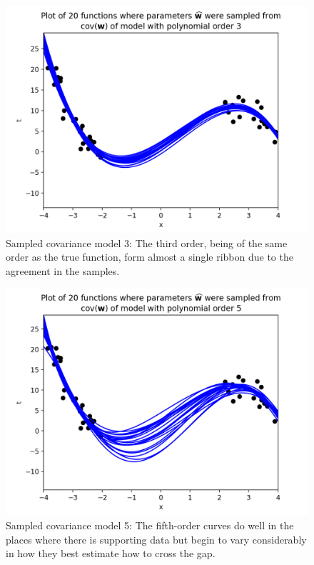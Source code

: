 \documentclass[10pt]{article}
\begin{document}
\begin{itemize}
\begin{figure}[H]
\centering
  \includegraphics[width=\linewidth]{sampled-fns-3.png}
 \caption{Sampled covariance model 3: The third order, being of the same order as the true function, form almost a single ribbon due to the agreement in the samples.}
\label{label}
\end{figure}

\begin{figure}[H]
\centering
  \includegraphics[width=\linewidth]{sampled-fns-5.png}
 \caption{Sampled covariance model 5: The fifth-order curves do well in the places where there is supporting data but begin to vary considerably in how they best estimate how to cross the gap.}
\label{label}
\end{figure}


\end{itemize}
\end{document}
